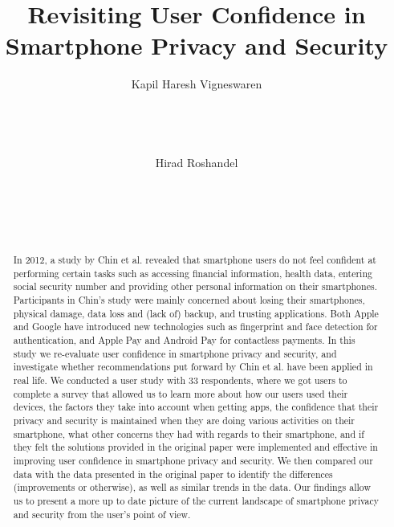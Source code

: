 \documentclass{sigchi}
\begin{document}
\title{Revisiting User Confidence in Smartphone Privacy and Security}

\author{
  \alignauthor Kapil Haresh Vigneswaren\\
    \\
    \\
    \\
    \\
  \alignauthor Hirad Roshandel\\
    \\
    \\
    \\
    \\
}


\maketitle

\begin{abstract}
In 2012, a study by Chin et al. revealed that smartphone users do not feel confident at performing certain tasks such as accessing financial information, health data, entering social security number and providing other personal information on their smartphones. Participants in Chin's study were mainly concerned about losing their smartphones, physical damage, data loss and (lack of) backup, and trusting applications. Both Apple and Google have introduced new technologies such as fingerprint and face detection for authentication, and Apple Pay and Android Pay for contactless payments. In this study we re-evaluate user confidence in smartphone privacy and security, and investigate whether recommendations put forward by Chin et al. have been applied in real life. We conducted a user study with 33 respondents, where we got users to complete a survey that allowed us to learn more about how our users used their devices, the factors they take into account when getting apps, the confidence that their privacy and security is maintained when they are doing various activities on their smartphone, what other concerns they had with regards to their smartphone, and if they felt the solutions provided in the original paper were implemented and effective in improving user confidence in smartphone privacy and security. We then compared our data with the data presented in the original paper to identify the differences (improvements or otherwise), as well as similar trends in the data. Our findings allow us to present a more up to date picture of the current landscape of smartphone privacy and security from the user's point of view.  
\end{abstract}
\end{document}
